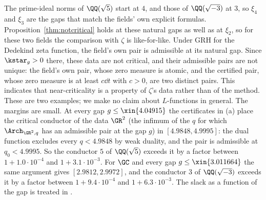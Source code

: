 \begin{remark}\label{rem:gap}
The prime-ideal norms of $\QQ(\sqrt5)$ start at $4$, and those of $\QQ(\sqrt{-3})$ at $3$, so $\xi_4$ and $\xi_3$ are the gaps that match the
fields' own explicit formulas. Proposition~\ref{thm:notcritical} holds at these natural gaps as well as at $\xi_2$, so for these two fields the
comparison with $\zeta$ is like-for-like. Under GRH for the Dedekind zeta function, the field's own pair is admissible at its natural gap.
Since $\kstar_g>0$ there, these data are not critical, and their admissible pairs are not unique: the field's own pair, whose zero measure is
atomic, and the certified pair, whose zero measure is at least $c\dd t$ with $c>0$, are two distinct pairs. This indicates that
near-criticality is a property of $\zeta$'s data rather than of the method. These are two examples; we make no claim about $L$-functions in
general. The margins are small. At every gap $g\le\xin{4.04915}$ the certificates in (a) place the critical conductor of the data $\GR^2$ (the
infimum of the $q$ for which $\Arch_{\GR^2,q}$ has an admissible pair at the gap $g$) in $[4.9848,4.9995]$: the dual function excludes every
$q<4.9848$ by weak duality, and the pair is admissible at $q_0<4.9995$. So the conductor $5$ of $\QQ(\sqrt5)$ exceeds it by a factor between
$1+1.0\cdot10^{-4}$ and $1+3.1\cdot10^{-3}$. For $\GC$ and every gap $g\le\xin{3.011664}$ the same argument gives $[2.9812,2.9972]$, and the
conductor $3$ of $\QQ(\sqrt{-3})$ exceeds it by a factor between $1+9.4\cdot10^{-4}$ and $1+6.3\cdot10^{-3}$. The slack as a
function of the gap is treated in \cite{N3}.
\end{remark}
